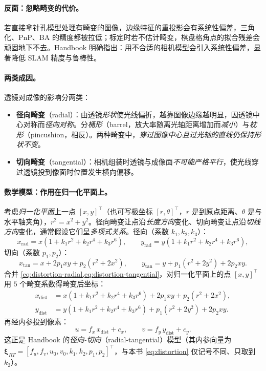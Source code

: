 \paragraph{反面：忽略畸变的代价。}
若直接拿针孔模型处理有畸变的图像，边缘特征的重投影会有系统性偏差，三角化、PnP、BA 的精度都被拉低；标定时若不估计畸变，棋盘格角点的拟合残差会顽固地下不去。Handbook\cite{carlone2026handbook} 明确指出：用不合适的相机模型会引入系统性偏差，显著降低 SLAM 精度与鲁棒性。

\paragraph{两类成因。}
透镜对成像的影响分两类\cite{gaoxiang2019slam14}：
\begin{itemize}
  \item \textbf{径向畸变}（radial）：由透镜\emph{形状}使光线偏折，越靠图像边缘越明显，因透镜中心对称而\emph{径向对称}。分\emph{桶形}（barrel，放大率随离光轴距离增加而\emph{减小}）与\emph{枕形}（pincushion，相反）。两种畸变中，\emph{穿过图像中心且过光轴的直线仍保持形状不变}。
  \item \textbf{切向畸变}（tangential）：相机组装时透镜与成像面\emph{不可能严格平行}，使光线穿过透镜投到像面时位置发生横向偏移。
\end{itemize}

\paragraph{数学模型：作用在归一化平面上。}
考虑\emph{归一化平面}上一点 $[x,y]^\top$（也可写极坐标 $[r,\theta]^\top$，$r$ 是到原点距离、$\theta$ 是与水平轴夹角），$r^2=x^2+y^2$\cite{gaoxiang2019slam14}。径向畸变让点沿\emph{长度方向}变化、切向畸变让点沿\emph{切线方向}变化，通常假设它们呈\emph{多项式关系}。径向（系数 $k_1,k_2,k_3$）：
\begin{equation}
  x_{\text{rad}}=x(1+k_1r^2+k_2r^4+k_3r^6),\qquad
  y_{\text{rad}}=y(1+k_1r^2+k_2r^4+k_3r^6),
  \label{eq:distortion-radial}
\end{equation}
切向（系数 $p_1,p_2$）：
\begin{equation}
  x_{\text{tan}}=x+2p_1xy+p_2(r^2+2x^2),\qquad
  y_{\text{tan}}=y+p_1(r^2+2y^2)+2p_2xy.
  \label{eq:distortion-tangential}
\end{equation}
合并 \cref{eq:distortion-radial,eq:distortion-tangential}，对归一化平面上的点 $[x,y]^\top$ 用 $5$ 个畸变系数得畸变后坐标：
\begin{equation}
  \begin{aligned}
  x_{\text{dist}}&=x(1+k_1r^2+k_2r^4+k_3r^6)+2p_1xy+p_2(r^2+2x^2),\\
  y_{\text{dist}}&=y(1+k_1r^2+k_2r^4+k_3r^6)+p_1(r^2+2y^2)+2p_2xy.
  \end{aligned}
  \label{eq:distortion}
\end{equation}
再经内参投到像素：
\begin{equation}
  u=f_x\,x_{\text{dist}}+c_x,\qquad v=f_y\,y_{\text{dist}}+c_y.
  \label{eq:distortion-pixel}
\end{equation}
这正是 Handbook 的\emph{径向-切向}（radial-tangential）模型\cite{carlone2026handbook}（其内参向量为 $\boldsymbol\xi_{RT}=[f_u,f_v,u_0,v_0,k_1,k_2,p_1,p_2]^\top$，与本书 \cref{eq:distortion} 仅记号不同、只取到 $k_2$）。

